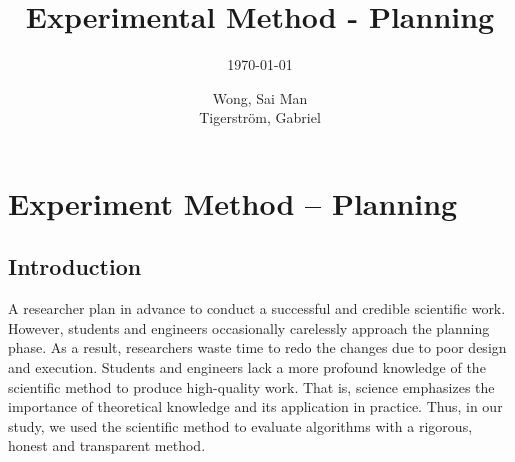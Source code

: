 \documentclass[a4paper,11pt]{kth-mag}
\title{Experimental Method - Planning}
\subtitle{\today}
\author{Wong, Sai Man\\ Tigerstr\"{o}m, Gabriel}
\newcommand*{\skippara}{\par\vspace{\baselineskip} \noindent}
\begin{document}
\frontmatter
\pagestyle{empty}
\removepagenumbers
\maketitle
{}



{
      \hypersetup{linkcolor=black}
      \tableofcontents*
}
\mainmatter
\pagestyle{newchap}



\chapter{Experiment Method -- Planning}
\section{Introduction}\label{sec:intro}

\skippara A researcher plan in advance to conduct a successful and credible scientific work.
However, students and engineers occasionally carelessly approach the planning phase.
As a result, researchers waste time to redo the changes due to poor design and execution.
Students and engineers lack a more profound knowledge of the scientific method to produce high-quality work.
That is, science emphasizes the importance of theoretical knowledge and its application in practice.
Thus, in our study, we used the scientific method to evaluate algorithms with a rigorous, honest and transparent method.
\end{document}
